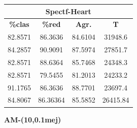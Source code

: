 \documentclass[11pt,a4paper]{article}
\theoremstyle{definition}
\begin{document}
\begin{tabbing}
{		\begin{tabular}{|c|c|c|c|}
			\hline
			\multicolumn{4}{|c|}{\textbf{Spectf-Heart}} \\ \hline
			\textbf{\%clas} & \textbf{\%red} & \textbf{Agr.} & \textbf{T} \\ \hline 
			82.8571 & 86.3636 & 84.6104 & 31948.6\\ \hline
84.2857 & 90.9091 & 87.5974 & 27851.7\\ \hline
82.8571 & 88.6364 & 85.7468 & 24348.3\\ \hline
82.8571 & 79.5455 & 81.2013 & 24233.2\\ \hline
91.1765 & 86.3636 & 88.7701 & 23697.4\\ \hline
84.8067 & 86.36364 & 85.5852 & 26415.84\\ \hline
		\end{tabular}
		}
	\end{tabbing}
	
	\textbf{AM-(10,0.1mej)}	
	
\end{document}
